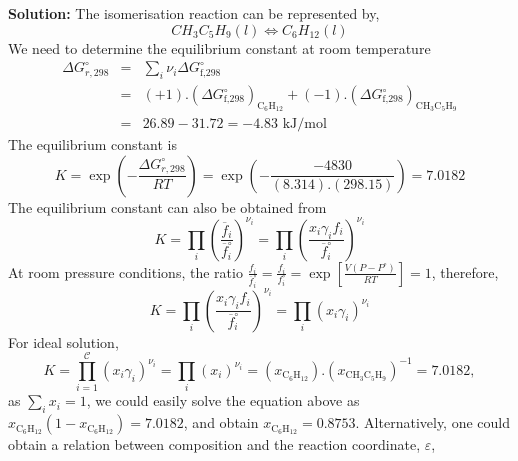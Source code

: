 \documentclass[12pts,a4paper,amsmath,amssymb,floatfix]{article}%
\newcommand{\frc}{\displaystyle\frac}
\newcommand{\summation}[3][error]{\sum\limits_{#2}^{#3}#1}
\newcounter{reaction}
\begin{document}
\begin{enumerate}[1)]
{\bf Solution:} The isomerisation reaction can be represented by,
    \begin{displaymath}
        CH_{3}C_{5}H_{9} (l) \Longleftrightarrow C_{6}H_{12} (l)
    \end{displaymath}
    We need to determine the equilibrium constant at room temperature
         \begin{eqnarray}
           \Delta G^{\circ}_{r,298} &=& \sum\limits_{i}\nu_{i}\Delta G^{\circ}_{\text{f,298}} \nonumber \\
                             &=& (+1).\left(\Delta G^{\circ}_{\text{f,298}}\right)_{\text{C}_{6}\text{H}_{12}} + (-1).\left(\Delta G^{\circ}_{\text{f,298}}\right)_{\text{CH}_{3}\text{C}_{5}\text{H}_{9}} \nonumber \\ 
                             &=& 26.89-31.72 = -4.83 \text{ kJ/mol} \nonumber
         \end{eqnarray}
       The equilibrium constant is
         \begin{displaymath}
             K = \exp\left(-\frc{\Delta G^{\circ}_{r,298}}{RT}\right) = \exp\left(-\frc{-4830}{(8.314).(298.15)}\right) = 7.0182
         \end{displaymath}
       The equilibrium constant can also be obtained from 
         \begin{displaymath}
            K = \prod\limits_{i}\left(\frc{\overline{f}_{i}}{\overline{f}^{\circ}_{i}}\right)^{\nu_{i}} = \prod\limits_{i}\left(\frc{x_{i}\gamma_{i} f_{i}}{\overline{f}^{\circ}_{i}}\right)^{\nu_{i}}
         \end{displaymath}
       At room pressure conditions, the ratio $\frc{f_{i}}{\overline{f}^{\circ}_{i}} = \frc{f_{i}}{f_{i}^{\circ}} = \exp\left[\frc{V\left(P-P^{\circ}\right)}{RT}\right]=1$, therefore,
         \begin{displaymath}
            K = \prod\limits_{i}\left(\frc{x_{i}\gamma_{i}f_{i}}{\overline{f}^{\circ}_{i}}\right)^{\nu_{i}} = \prod\limits_{i}\left(x_{i}\gamma_{i}\right)^{\nu_{i}}
         \end{displaymath}
       For ideal solution,
         \begin{displaymath}
            K = \prod\limits_{i=1}^{\mathcal{C}}\left(x_{i}\gamma_{i}\right)^{\nu_{i}} = \prod\limits_{i}\left(x_{i}\right)^{\nu_{i}} = \left(x_{\text{C}_{6}\text{H}_{12}}\right).\left(x_{\text{CH}_{3}\text{C}_{5}\text{H}_{9}}\right)^{-1} = 7.0182,
         \end{displaymath}
         as $\summation[x_{i}]{i}{}=1$, we could easily solve the equation above as $x_{\text{C}_{6}\text{H}_{12}}\left(1-x_{\text{C}_{6}\text{H}_{12}}\right)=7.0182$, and obtain $x_{\text{C}_{6}\text{H}_{12}}=0.8753$. Alternatively, one could obtain a relation between composition and the reaction coordinate, $\varepsilon$,

\end{enumerate}
\end{document}

